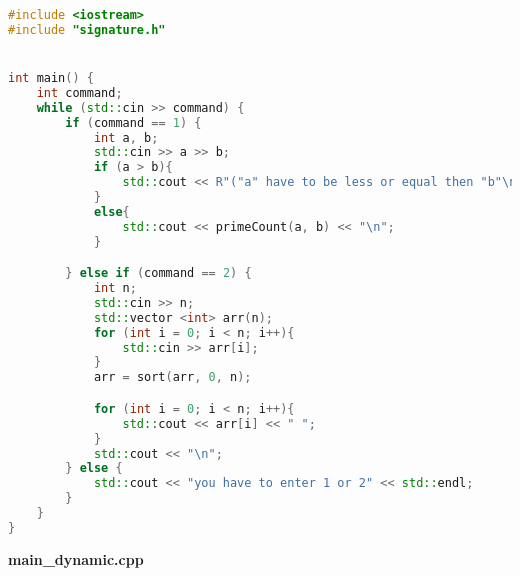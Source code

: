 \documentclass[pdf, unicode, 12pt, a4paper,oneside,fleqn]{article}
\begin{document}
\begin{lstlisting}[language=C++]
#include <iostream>
#include "signature.h"


int main() {
    int command;
    while (std::cin >> command) {
        if (command == 1) {
            int a, b;
            std::cin >> a >> b;
            if (a > b){
                std::cout << R"("a" have to be less or equal then "b"\n)";
            }
            else{
                std::cout << primeCount(a, b) << "\n";
            }

        } else if (command == 2) {
            int n;
            std::cin >> n;
            std::vector <int> arr(n);
            for (int i = 0; i < n; i++){
                std::cin >> arr[i];
            }
            arr = sort(arr, 0, n);

            for (int i = 0; i < n; i++){
                std::cout << arr[i] << " ";
            }
            std::cout << "\n";
        } else {
            std::cout << "you have to enter 1 or 2" << std::endl;
        }
    }
}

\end{lstlisting}

{\large\textbf{main_dynamic.cpp}}
\end{document}
